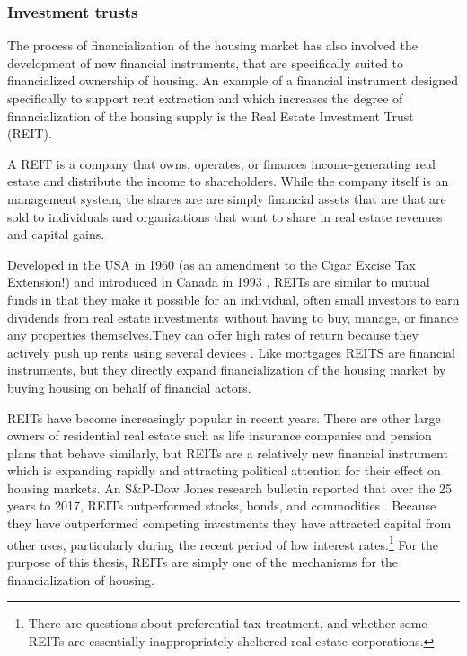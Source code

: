 \subsubsection{Investment trusts}
The process of financialization of the housing market has also involved the development of new financial instruments, that are specifically suited to financialized ownership of housing. An example of a financial instrument designed specifically to support rent extraction and which increases the degree of financialization of the housing supply is the Real Estate Investment Trust (\gls{REIT}). 

A REIT is a company that owns, operates, or finances income-generating real estate and distribute the income to shareholders. While the company itself is an management system, the shares are are simply financial assets that are that are sold to individuals and organizations that want to share in real estate revenues and capital gains. 

Developed in the USA  in 1960 (as an amendment to the Cigar Excise Tax Extension!) and introduced in Canada in 1993 \cite{GET_REITsDevelopedDates}, REITs are similar to mutual funds in that they make it possible for an individual, often small investors to earn dividends from real estate investments without having to buy, manage, or finance any properties themselves.They can offer high rates of return because they actively push up rents using several devices \cite{GET-Martine-August, farhaReportFinancializationHousing2017}. Like mortgages REITS are financial instruments, but they directly expand financialization of the housing market by buying housing on behalf of financial actors. 

REITs have become increasingly popular in recent years. There are other large owners of residential real estate such as life insurance companies and pension plans that behave similarly, but REITs are a relatively new financial instrument which is expanding rapidly and attracting political attention for their effect on housing markets.  %
An S\&P-Dow Jones research bulletin reported that over the 25 years to 2017, REITs outperformed stocks, bonds, and commodities \cite{GET-Dow-Jones-research-bulletin}. Because they have outperformed competing investments they have attracted  capital from other uses, particularly during the recent period of low interest rates.\footnote{There are questions about preferential tax treatment, and whether some REITs are essentially inappropriately sheltered real-estate corporations.} For the purpose of this thesis, REITs are simply one of the mechanisms for the financialization of housing.

